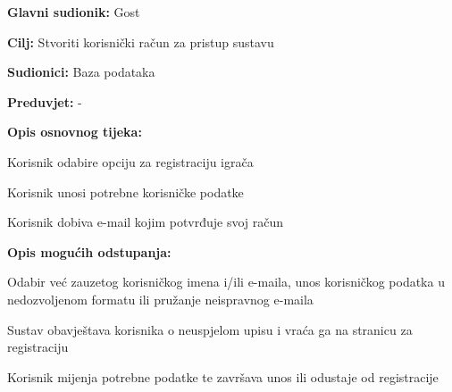 				
					\noindent {}
					\begin{packed_item}
	
						\item \textbf{Glavni sudionik: }Gost
						\item  \textbf{Cilj:} Stvoriti korisnički račun za pristup sustavu
						\item  \textbf{Sudionici:} Baza podataka
						\item  \textbf{Preduvjet:} -
						\item  \textbf{Opis osnovnog tijeka:}
						
						\item[] \begin{packed_enum}
	
							\item Korisnik odabire opciju za registraciju igrača
							\item Korisnik unosi potrebne korisničke podatke
							\item Korisnik dobiva e-mail kojim potvrđuje svoj račun

						\end{packed_enum}
						
						\item  \textbf{Opis mogućih odstupanja:}
						
						\item[] \begin{packed_item}
	
							\item[2.a] Odabir već zauzetog korisničkog imena i/ili e-maila, unos korisničkog podatka u nedozvoljenom formatu ili pružanje neispravnog e-maila
							\item[] \begin{packed_enum}
								
								\item Sustav obavještava korisnika o neuspjelom upisu i vraća ga na stranicu za registraciju
								\item Korisnik mijenja potrebne podatke te završava unos ili odustaje od registracije
								
							\end{packed_enum}
							
						\end{packed_item}
					\end{packed_item}
					
